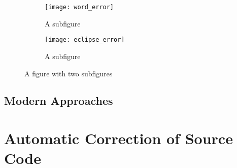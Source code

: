 \begin{figure}
\centering
\begin{subfigure}[b]{.5\textwidth}
  \centering
  \texttt{[image: word\_error]}
  \caption{A subfigure}
  \label{fig:sub1}
\end{subfigure}%
\begin{subfigure}[b]{.5\textwidth}
  \centering
  \texttt{[image: eclipse\_error]}
  \caption{A subfigure}
  \label{fig:sub2}
\end{subfigure}
\caption{A figure with two subfigures}
\label{fig:test}
\end{figure}

\subsection{Modern Approaches}


\section{Automatic Correction of Source Code}
